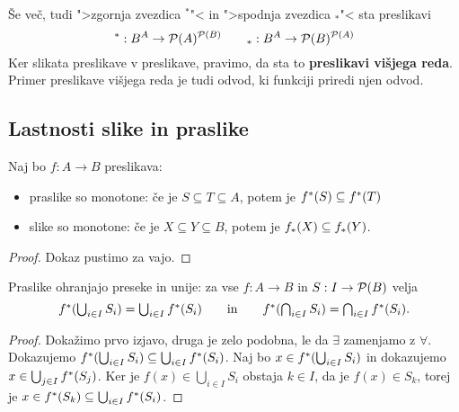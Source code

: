 Še več, tudi ">zgornja zvezdica $^{*}$"< in ">spodnja zvezdica $_{*}$"< sta preslikavi
%
\begin{equation*}
  {}^* : B^A \to \mathcal{P}(A)^{\mathcal{P}(B)} \qquad
  {}_* : B^A \to \mathcal{P}(B)^{\mathcal{P}(A)}
\end{equation*}
%
Ker slikata preslikave v preslikave, pravimo, da sta to \textbf{preslikavi višjega reda}. Primer preslikave višjega reda je tudi odvod, ki funkciji priredi njen odvod.


\subsection{Lastnosti slike in praslike}

\begin{izrek}
  Naj bo $f : A \to B$ preslikava:
  \begin{itemize}
  \item praslike so monotone: če je $S \subseteq T \subseteq A$, potem je $f^{*}(S) \subseteq f^{*}(T)$
  \item slike so monotone: če je $X \subseteq Y \subseteq B$, potem je $f_{*}(X) \subseteq f_{*}(Y)$.
  \end{itemize}
\end{izrek}

\begin{proof}
  Dokaz pustimo za vajo.
\end{proof}

\begin{izrek}
  Praslike ohranjajo preseke in unije: za vse $f : A \to B$ in $S : I \to \mathcal{P}(B)$ velja
  \begin{equation*}
    \textstyle
    f^{*} (\bigcup_{i \in I} S_i) = \bigcup_{i \in I} f^{*}(S_i)
    \qquad\text{in}\qquad
    f^{*} (\bigcap_{i \in I} S_i) = \bigcap_{i \in I} f^{*}(S_i).
  \end{equation*}
\end{izrek}

\begin{proof}
  Dokažimo prvo izjavo, druga je zelo podobna, le da $\exists$ zamenjamo z $\forall$.
  Dokazujemo $f^{*} (\bigcup_{i \in I} S_i) \subseteq \bigcup_{i \in I} f^{*}(S_i)$.
  Naj bo $x \in f^{*} (\bigcup_{i \in I} S_i)$ in dokazujemo $x \in \bigcup_{j \in I} f^{*}(S_j)$.
  Ker je $f(x) \in \bigcup_{i \in I} S_i$ obstaja $k \in I$, da je $f(x) \in S_k$, torej je
  $x \in f^{*}(S_k) \subseteq \bigcup_{i \in I} f^{*}(S_i)$.
\end{proof}

